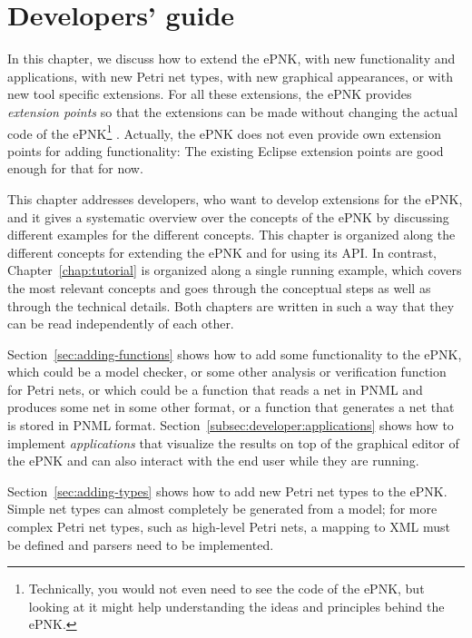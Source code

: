 \chapter{Developers' guide}
\label{chap:developers-guide}

In this chapter, we discuss how to extend the ePNK, with new functionality and
applications, with new Petri net types, with new graphical appearances, or with
new tool specific extensions. For all these extensions, the ePNK provides
\emph{extension points} so that the extensions can be made without changing
the actual code of the ePNK\footnote
 {Technically, you would not even need to see the code of the ePNK, but
  looking at it might help understanding the ideas and principles behind the
  ePNK.}%
. Actually, the ePNK does not even provide own extension points for adding
functionality: The existing Eclipse extension points are good enough for
that for now.

This chapter addresses developers, who want to develop extensions for the ePNK,
and it gives a systematic overview over the concepts of the ePNK by discussing
different examples for the different concepts. This chapter is organized along
the different concepts for extending the ePNK and for using its API. In
contrast, Chapter~\ref{chap:tutorial} is organized along a single running
example, which covers the most relevant concepts and goes through the
conceptual steps as well as through the technical details. Both chapters
are written in such a way that they can be read independently of each other.

Section~\ref{sec:adding-functions} shows how to add some functionality to the
ePNK, which could be a model checker, or some other analysis or verification
function for Petri nets, or which could be a function that reads a net in PNML
and produces some net in some other format, or a function that generates a net
that is stored in PNML format. Section~\ref{subsec:developer:applications}
shows how to implement \emph{applications}%
that visualize the results on top of the graphical editor of the ePNK and can
also interact with the end user while they are running.

Section~\ref{sec:adding-types} shows how to add new Petri net types
to the ePNK. Simple net types can almost completely be generated from a
model; for more complex Petri net types, such as high-level Petri nets, a
mapping to XML must be defined and parsers need to  be implemented.


